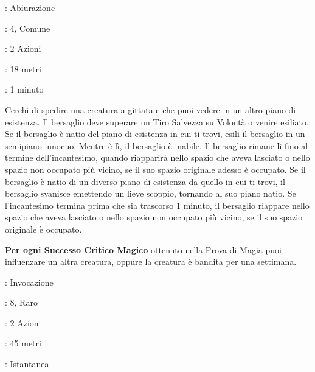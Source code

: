 \begin{multicols}{2}
\noindent\colorbox{OBSSgold!10}{
\begin{minipage}{0.95\linewidth}
\begin{description}[noitemsep, topsep=0pt, parsep=0pt, partopsep=0pt, leftmargin=0cm, labelwidth=1.3cm]
	\item[\textbf{Lista}]: Abiurazione
	\item[\textbf{Livello}]: 4, Comune
	\item[\textbf{Lancio}]: 2 Azioni
	\item[\textbf{Gittata}]: 18 metri
	\item[\textbf{Durata}]: 1 minuto
\end{description}
\end{minipage}}\smallskip

Cerchi di spedire una creatura a gittata e che puoi vedere in un altro piano di esistenza. Il bersaglio deve superare un Tiro Salvezza su Volontà o venire esiliato. Se il bersaglio è natio del piano di esistenza in cui ti trovi, esili il bersaglio in un semipiano innocuo. Mentre è lì, il bersaglio è inabile. Il bersaglio rimane lì fino al termine dell'incantesimo, quando riapparirà nello spazio che aveva lasciato o nello spazio non occupato più vicino, se il suo spazio originale adesso è occupato. Se il bersaglio è natio di un diverso piano di esistenza da quello in cui ti trovi, il bersaglio svanisce emettendo un lieve scoppio, tornando al suo piano natio. Se l'incantesimo termina prima che sia trascorso 1 minuto, il bersaglio riappare nello spazio che aveva lasciato o nello spazio non occupato più vicino, se il suo spazio originale è occupato.

\textbf{Per ogni Successo Critico Magico} ottenuto nella Prova di Magia puoi influenzare un altra creatura, oppure la creatura è bandita per una settimana.

\noindent\colorbox{OBSSgold!10}{
\begin{minipage}{0.95\linewidth}
\begin{description}[noitemsep, topsep=0pt, parsep=0pt, partopsep=0pt, leftmargin=0cm, labelwidth=1.3cm]
	\item[\textbf{Lista}]: Invocazione
	\item[\textbf{Livello}]: 8, Raro
	\item[\textbf{Lancio}]: 2 Azioni
	\item[\textbf{Gittata}]: 45 metri
	\item[\textbf{Durata}]: Istantanea
\end{description}
\end{minipage}}\smallskip


\end{multicols}
